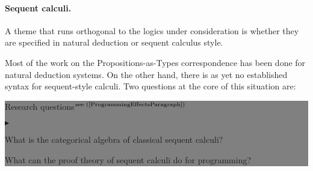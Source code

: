 \documentclass[11pt,twocolumn]{article}
\newenvironment{btritemize}
  {\begin{list}{\btr}
  {\setlength{\topsep}{2pt}
   \setlength{\partopsep}{2pt}
   \setlength{\itemsep}{2.5pt}
   \setlength{\parsep}{2.5pt}
   \setlength{\leftmargin}{1em}
   \setlength{\labelwidth}{.5em}}}
  {\end{list}}
\newcommand{\mytextsf}[1]{\textsf{\small #1}}
\newcommand{\hide}[1]{}
\newcommand{\eg}{\emph{eg.}}
\newcommand{\SysL}{$L$}%
\newcommand{\btr}{$\blacktriangleright$}
\newcommand{\reqpsize}{8.113395cm}%
\newcommand{\req}[2]{\begin{center}\colorbox{grey}{\begin{minipage}{\reqpsize} 
  \mytextsf{Research question}\hfill$^{\mbox{\scriptsize see #1 }}$\\[-5.5mm]
  \begin{btritemize}
  \item #2
  \end{btritemize}
\end{minipage}}\end{center}}
\newcommand{\reqs}[2]{\begin{center}\colorbox{grey}{\begin{minipage}{\reqpsize}
  \mytextsf{Research questions}\hfill$^{\mbox{\scriptsize see #1 }}$\\[-5.5mm]
  \begin{btritemize}
  \item #2
  \end{btritemize}
\end{minipage}}\end{center}}
\newcommand{\rep}[2]{\begin{center}\colorbox{grey}{\begin{minipage}{\reqpsize}
  \mytextsf{Research pathway}\hfill$^{\mbox{\scriptsize see #1 }}$\\[-5.5mm]
  \begin{btritemize}
  \item #2
  \end{btritemize}
\end{minipage}}\end{center}}
\begin{document}
\hide{
From the logical point of view, resource and effect structure are so-called
modal operators, and some of the literature has indeed considered them as
such.  %
The field of modal logics is broad, with many subfields of specialised logics
motivated by computation, linguistics, and philosophy.  While a class of modal
logics known as temporal logics have played a prominent role, and been very
successful, in the area of computer aided verification; the impact of modal
logics on programming languages has been peripheral.  It is thus natural and
important to reconsider them in this context. 
%
\rep{(\ref{ModalLogicsParagraph}\,\&\,\ref{MetaprogrammingParagraph})}
  {Investigate the Propositions-as-Types 
    correspondence %
    for modal logics, and apply it to programming languages.}
We stress that we are specially interested in modalities for computation with
reflection.
}

\paragraph*{Sequent calculi.}
\label{SequentCalculiParagraph}

A theme that runs orthogonal to the logics under consideration is whether
they are specified in natural deduction or sequent calculus
style. %

Most of the work on the Propositions-as-Types correspondence has been done for
natural deduction systems. %
%
On the other hand, there is as yet no established syntax for sequent-style
calculi.  
Two questions at the core of this situation are:
%
\reqs{(\ref{ProgrammingEffectsParagraph})}
  {What is the categorical algebra of classical sequent calculi? %
%
\hide{
Nevertheless, a syntactic formalism that is proving robust in applications
seems to be emerging.  This will be referred to as the calculus,
formalism, or system~\SysL; and underlies the ones developed
in~\eg~\cite{CurienHerbelin,Wadler,Munch,CurienMunch}.

The main novel features of the formalism~\SysL, and its philosophy, are an
intrinsic symmetry (corresponding to the computation roles of program and
environment) with syntax that reflects an adjoint situation and is closely
connected to abstract machines (which are in fact internal to the
calculus).  From this perspective we ask:
}
%
  What can the proof theory of sequent calculi do for programming?}
\end{document}
